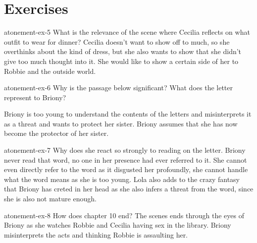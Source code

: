 \documentclass[preview]{standalone}
\begin{document}
\section{Exercises}

\begin{snippetexercise}{atonement-ex-5}%
{What is the relevance of the scene where Cecilia reflects on what outfit to wear for dinner?}
Cecilia doesn't want to show off to much, so she overthinks about the kind of dress,
but she also wants to show that she didn't give too much thought into it.
She would like to show a certain side of her to Robbie and the outside world.
\end{snippetexercise}

\begin{snippetexercise}{atonement-ex-6}%
{Why is the passage below significant? What does the letter represent to Briony?}
\hspace{2cm}

Briony is too young to understand the contents of the letters and
misinterprets it as a threat and wants to protect her sister.
Briony assumes that she has now become the protector of her sister. 
\end{snippetexercise}

\begin{snippetexercise}{atonement-ex-7}%
{Why does she react so strongly to reading  on the letter.}
Briony never read that word, no one in her presence had ever referred to it.
She cannot even directly refer to the word as it disgusted her profoundly,
she cannot handle what the word means as she is too young.
Lola also adds to the crazy fantasy that Briony has creted in her head
as she also infers a threat from the word, since she is also not mature enough.
\end{snippetexercise}

\begin{snippetexercise}{atonement-ex-8}%
{How does chapter 10 end?}
The scenes ends through the eyes of Briony as she watches Robbie and Cecilia
having sex in the library. Briony misinterprets the acts and thinking Robbie is assaulting her.
\end{snippetexercise}
\end{document}
